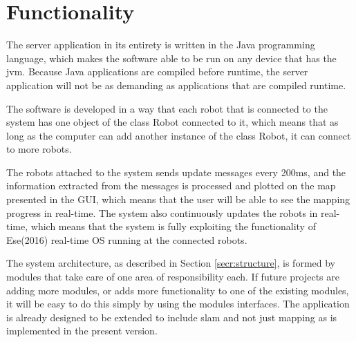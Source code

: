 \section{Functionality}
The server application in its entirety is written in the Java programming language, which makes the software able to be run on any device that has the \acrlong{jvm}. Because Java applications are compiled before runtime, the server application will not be as demanding as applications that are compiled runtime. 

The software is developed in a way that each robot that is connected to the system has one object of the class Robot connected to it, which means that as long as the computer can add another instance of the class Robot, it can connect to more robots. 

The robots attached to the system sends update messages every 200ms, and the information extracted from the messages is processed and plotted on the map presented in the GUI, which means that the user will be able to see the mapping progress in real-time. The system also continuously updates the robots in real-time, which means that the system is fully exploiting the functionality of Ese(2016) real-time OS running at the connected robots.

The system architecture, as described in Section \ref{secr:structure}, is formed by modules that take care of one area of responsibility each. If future projects are adding more modules, or adds more functionality to one of the existing modules, it will be easy to do this simply by using the modules interfaces. The application is already designed to be extended to include \acrfull{slam} and not just mapping as is implemented in the present version.